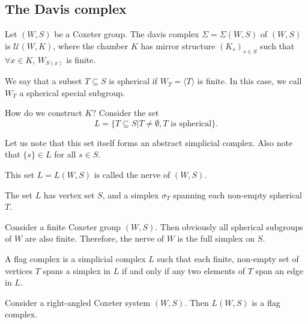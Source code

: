 \documentclass[11pt]{article}
\begin{document}
\subsection{The Davis complex}

\begin{definition}
    Let $(W,S)$ be a Coxeter group. The davis complex $\Sigma=\Sigma(W,S)$ of $(W,S)$ is $\mathcal{U}(W,K)$, where  the chamber $K$ has mirror structure $(K_s)_{s\in S}$ such that $\forall x\in K$, $W_{S(x)}$ is finite.
\end{definition}


\begin{definition}
    We say that a subset $T\subseteq S$ is spherical if $W_T=\langle T\rangle$ is finite. In this case, we call $W_T$ a spherical special subgroup.  
\end{definition}

How do we construct $K$? Consider the set 
\[L=\{T\subseteq S|T\neq\emptyset, T\text{ is spherical}\}.\]

Let us note that this set itself forms an abstract simplicial complex. Also note that $\{s\}\in L$ for all $s\in S$. 

\begin{definition}
    This set $L=L(W,S)$ is called the nerve of $(W,S)$. 
\end{definition}

The set $L$ has vertex set $S$, and a simplex $\sigma_T$ spanning each non-empty spherical $T$.

\begin{example}
    Consider a finite Coxeter group $(W,S)$. Then obviously all spherical subgroups of $W$ are also finite. Therefore, the nerve of $W$ is the full simplex on $S$. 
\end{example}

\begin{example}
    
\end{example}


\begin{definition}
    A flag complex is a simplicial complex $L$ such that each finite, non-empty set of vertices $T$ spans a simplex in $L$ if and only if any two elements of $T$ span an edge in $L$. 
\end{definition}

\begin{lemma}
    Consider a right-angled Coxeter system $(W,S)$. Then $L(W,S)$ is a flag complex.
\end{lemma}
\end{document}
